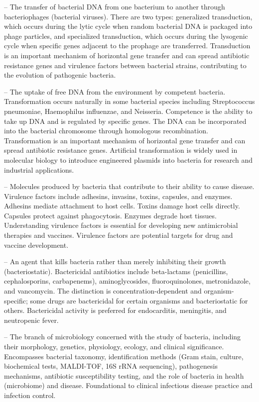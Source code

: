-- The transfer of bacterial DNA from one bacterium to another through bacteriophages (bacterial viruses). There are two types: generalized transduction, which occurs during the lytic cycle when random bacterial DNA is packaged into phage particles, and specialized transduction, which occurs during the lysogenic cycle when specific genes adjacent to the prophage are transferred. Transduction is an important mechanism of horizontal gene transfer and can spread antibiotic resistance genes and virulence factors between bacterial strains, contributing to the evolution of pathogenic bacteria.

-- The uptake of free DNA from the environment by competent bacteria. Transformation occurs naturally in some bacterial species including Streptococcus pneumoniae, Haemophilus influenzae, and Neisseria. Competence is the ability to take up DNA and is regulated by specific genes. The DNA can be incorporated into the bacterial chromosome through homologous recombination. Transformation is an important mechanism of horizontal gene transfer and can spread antibiotic resistance genes. Artificial transformation is widely used in molecular biology to introduce engineered plasmids into bacteria for research and industrial applications.

-- Molecules produced by bacteria that contribute to their ability to cause disease. Virulence factors include adhesins, invasins, toxins, capsules, and enzymes. Adhesins mediate attachment to host cells. Toxins damage host cells directly. Capsules protect against phagocytosis. Enzymes degrade host tissues. Understanding virulence factors is essential for developing new antimicrobial therapies and vaccines. Virulence factors are potential targets for drug and vaccine development.

-- An agent that kills bacteria rather than merely inhibiting their growth (bacteriostatic). Bactericidal antibiotics include beta-lactams (penicillins, cephalosporins, carbapenems), aminoglycosides, fluoroquinolones, metronidazole, and vancomycin. The distinction is concentration-dependent and organism-specific; some drugs are bactericidal for certain organisms and bacteriostatic for others. Bactericidal activity is preferred for endocarditis, meningitis, and neutropenic fever.

-- The branch of microbiology concerned with the study of bacteria, including their morphology, genetics, physiology, ecology, and clinical significance. Encompasses bacterial taxonomy, identification methods (Gram stain, culture, biochemical tests, MALDI-TOF, 16S rRNA sequencing), pathogenesis mechanisms, antibiotic susceptibility testing, and the role of bacteria in health (microbiome) and disease. Foundational to clinical infectious disease practice and infection control.

